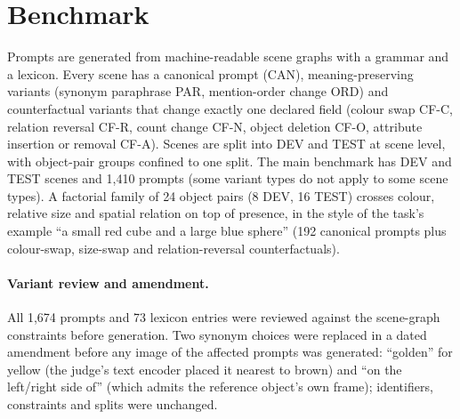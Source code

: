 \section{Benchmark}\label{sec:benchmark}
Prompts are generated from machine-readable scene graphs with a grammar and a lexicon. Every scene has a canonical prompt (CAN), meaning-preserving variants (synonym paraphrase PAR, mention-order change ORD) and counterfactual variants that change exactly one declared field (colour swap CF-C, relation reversal CF-R, count change CF-N, object deletion CF-O, attribute insertion or removal CF-A). Scenes are split into DEV and TEST at scene level, with object-pair groups confined to one split. The main benchmark has \devScenes{} DEV and \testScenes{} TEST scenes and 1,410 prompts (some variant types do not apply to some scene types). A factorial family of 24 object pairs (8 DEV, 16 TEST) crosses colour, relative size and spatial relation on top of presence, in the style of the task's example ``a small red cube and a large blue sphere'' (192 canonical prompts plus colour-swap, size-swap and relation-reversal counterfactuals).
\paragraph{Variant review and amendment.} All 1,674 prompts and 73 lexicon entries were reviewed against the scene-graph constraints before generation. Two synonym choices were replaced in a dated amendment before any image of the affected prompts was generated: ``golden'' for yellow (the judge's text encoder placed it nearest to brown) and ``on the left/right side of'' (which admits the reference object's own frame); identifiers, constraints and splits were unchanged.

